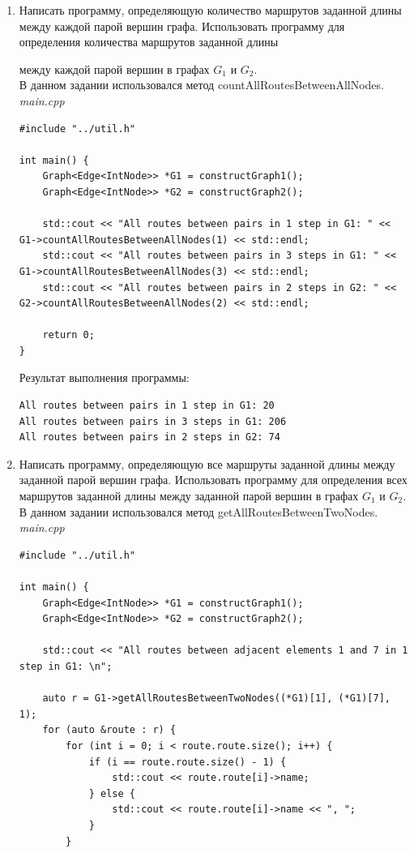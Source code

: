 \documentclass[a4paper,14pt]{extarticle}
\begin{document}
\begin{enumerate}[1.]
        \item Написать программу, определяющую количество маршрутов
заданной длины между каждой парой вершин графа. Использовать
программу для определения количества маршрутов заданной длины

между каждой парой вершин в графах $G_1$ и $G_2$.\\
        В данном задании использовался метод countAllRoutesBetweenAllNodes.\\
        \textit{main.cpp}
        \begin{verbatim}
#include "../util.h"

int main() {
    Graph<Edge<IntNode>> *G1 = constructGraph1();
    Graph<Edge<IntNode>> *G2 = constructGraph2();

    std::cout << "All routes between pairs in 1 step in G1: " << G1->countAllRoutesBetweenAllNodes(1) << std::endl;
    std::cout << "All routes between pairs in 3 steps in G1: " << G1->countAllRoutesBetweenAllNodes(3) << std::endl;
    std::cout << "All routes between pairs in 2 steps in G2: " << G2->countAllRoutesBetweenAllNodes(2) << std::endl;

    return 0;
}
        \end{verbatim}
        Результат выполнения программы:
        \begin{verbatim}
All routes between pairs in 1 step in G1: 20
All routes between pairs in 3 steps in G1: 206
All routes between pairs in 2 steps in G2: 74
        \end{verbatim}


        \item Написать программу, определяющую все маршруты заданной
        длины между заданной парой вершин графа. Использовать программу
        для определения всех маршрутов заданной длины между заданной 
        парой вершин в графах $G_1$ и $G_2$.\\
        В данном задании использовался метод getAllRoutesBetweenTwoNodes.\\
        \textit{main.cpp}
        \begin{verbatim}
#include "../util.h"

int main() {
    Graph<Edge<IntNode>> *G1 = constructGraph1();
    Graph<Edge<IntNode>> *G2 = constructGraph2();

    std::cout << "All routes between adjacent elements 1 and 7 in 1 step in G1: \n";
    
    auto r = G1->getAllRoutesBetweenTwoNodes((*G1)[1], (*G1)[7], 1);
    for (auto &route : r) {
        for (int i = 0; i < route.route.size(); i++) {
            if (i == route.route.size() - 1) {
                std::cout << route.route[i]->name;
            } else {
                std::cout << route.route[i]->name << ", ";
            }
        }


\end{verbatim}
\end{enumerate}
\end{document}
